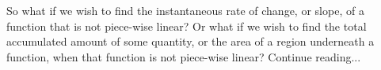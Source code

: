 
So what if we wish to find the instantaneous rate of change, or slope, of a function that is not piece-wise linear?  Or what if we wish to find the total accumulated amount of some quantity, or the area of a region underneath a function, when that function is not piece-wise linear?  Continue reading...

\cleardoublepage